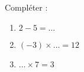 
\begin{mental}
   
    Compléter :
    \begin{enumerate}
        \item
            \( 2-5=\ldots\)
        \item
            \( (-3)\times \ldots=12\)
        \item
            \( \ldots\times 7=3\)
    \end{enumerate}

\end{mental}
